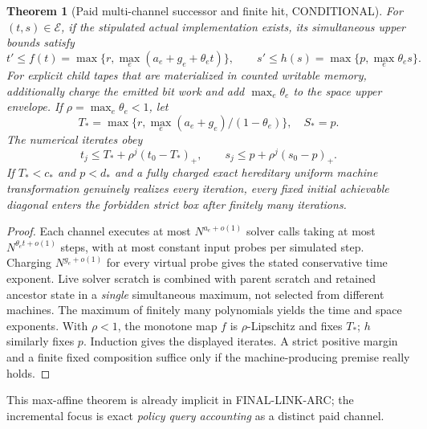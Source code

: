 \documentclass[11pt]{article}
\newtheorem{theorem}{Theorem}
\newcommand{\EE}{\mathcal E}
\begin{document}
\begin{theorem}[Paid multi-channel successor and finite hit, CONDITIONAL]
For $(t,s)\in\EE$, if the stipulated actual implementation exists, its simultaneous upper bounds satisfy
\[
t'\le f(t)=\max\{r,\max_e(a_e+g_e+\theta_e t)\},\qquad
s'\le h(s)=\max\{p,\max_e\theta_e s\}.
\]
For explicit child tapes that are materialized in counted writable memory, additionally charge the emitted bit work and add $\max_e\theta_e$ to the space upper envelope. If $\rho=\max_e\theta_e<1$, let
\[
T_*=\max\{r,\max_e(a_e+g_e)/(1-\theta_e)\},\quad S_*=p.
\]
The numerical iterates obey
\[
t_j\le T_*+\rho^j(t_0-T_*)_+,\qquad
s_j\le p+\rho^j(s_0-p)_+.
\]
If $T_*<c_*$ and $p<d_*$ and a fully charged exact hereditary uniform machine transformation genuinely realizes every iteration, every fixed initial achievable diagonal enters the forbidden strict box after finitely many iterations.
\end{theorem}
\begin{proof}
Each channel executes at most $N^{a_e+o(1)}$ solver calls taking at most $N^{\theta_e t+o(1)}$ steps, with at most constant input probes per simulated step. Charging $N^{g_e+o(1)}$ for every virtual probe gives the stated conservative time exponent. Live solver scratch is combined with parent scratch and retained ancestor state in a \emph{single} simultaneous maximum, not selected from different machines. The maximum of finitely many polynomials yields the time and space exponents. With $\rho<1$, the monotone map $f$ is $\rho$-Lipschitz and fixes $T_*$; $h$ similarly fixes $p$. Induction gives the displayed iterates. A strict positive margin and a finite fixed composition suffice only if the machine-producing premise really holds.
\end{proof}
This max-affine theorem is already implicit in FINAL-LINK-ARC; the incremental focus is exact \emph{policy query accounting} as a distinct paid channel.
\end{document}
